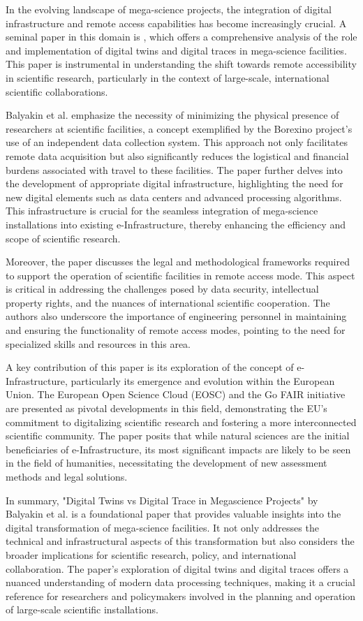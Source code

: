 In the evolving landscape of mega-science projects, the integration of digital
infrastructure and remote access capabilities has become increasingly crucial.
A seminal paper in this domain is \cite{Balyakin2021Digital}, which offers a
comprehensive analysis of the role and implementation of digital twins and
digital traces in mega-science facilities. This paper is instrumental in
understanding the shift towards remote accessibility in scientific research,
particularly in the context of large-scale, international scientific
collaborations.

Balyakin et al. emphasize the necessity of minimizing the physical presence of
researchers at scientific facilities, a concept exemplified by the Borexino
project's use of an independent data collection system. This approach not only
facilitates remote data acquisition but also significantly reduces the
logistical and financial burdens associated with travel to these facilities.
The paper further delves into the development of appropriate digital
infrastructure, highlighting the need for new digital elements such as data
centers and advanced processing algorithms. This infrastructure is crucial for
the seamless integration of mega-science installations into existing
e-Infrastructure, thereby enhancing the efficiency and scope of scientific
research.

Moreover, the paper discusses the legal and methodological frameworks required
to support the operation of scientific facilities in remote access mode. This
aspect is critical in addressing the challenges posed by data security,
intellectual property rights, and the nuances of international scientific
cooperation. The authors also underscore the importance of engineering
personnel in maintaining and ensuring the functionality of remote access modes,
pointing to the need for specialized skills and resources in this area.

A key contribution of this paper is its exploration of the concept of
e-Infrastructure, particularly its emergence and evolution within the European
Union. The European Open Science Cloud (EOSC) and the Go FAIR initiative are
presented as pivotal developments in this field, demonstrating the EU's
commitment to digitalizing scientific research and fostering a more
interconnected scientific community. The paper posits that while natural
sciences are the initial beneficiaries of e-Infrastructure, its most
significant impacts are likely to be seen in the field of humanities,
necessitating the development of new assessment methods and legal solutions.

In summary, "Digital Twins vs Digital Trace in Megascience Projects" by
Balyakin et al. is a foundational paper that provides valuable insights into
the digital transformation of mega-science facilities. It not only addresses
the technical and infrastructural aspects of this transformation but also
considers the broader implications for scientific research, policy, and
international collaboration. The paper's exploration of digital twins and
digital traces offers a nuanced understanding of modern data processing
techniques, making it a crucial reference for researchers and policymakers
involved in the planning and operation of large-scale scientific installations.
